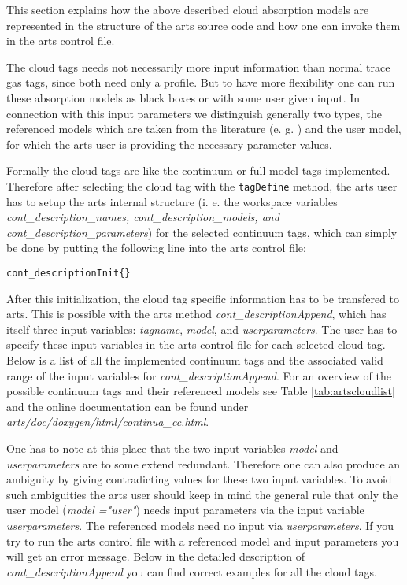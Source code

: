 {This section explains how the above described cloud absorption models
are represented in the structure of the arts source code and how 
one can invoke them in the arts control file.

The cloud tags needs not necessarily more input information than 
normal trace gas tags, since both need only a profile. But to have 
more flexibility one can run these absorption models as black boxes 
or with some user given input. In connection with this input parameters 
we distinguish generally two types, the referenced models which 
are taken from the literature (e. g. \cite{liebeetal:93}) and the 
user model, for which the arts user is providing the necessary 
parameter values.

Formally the cloud tags are like the 
continuum or full model tags implemented. Therefore after selecting 
the cloud tag with the {\tt tagDefine} method, the arts user has to 
setup the arts internal structure (i. e. the workspace variables 
{\it cont\_description\_names, cont\_description\_models, 
and cont\_description\_parameters}) for the selected continuum tags, 
which can simply be done by putting the following line into the 
arts control file:
\begin{verbatim}
cont_descriptionInit{}
\end{verbatim}

After this initialization, the cloud tag specific
information has to be transfered to arts. This is possible with the 
arts method {\it cont\_descriptionAppend}, which has itself 
three input variables: {\it tagname}, {\it model}, and 
{\it userparameters}. The user has to specify these input 
variables in the arts control file for each selected cloud tag. 
Below is a list of all the implemented continuum tags and the associated
valid range of the input variables for {\it cont\_descriptionAppend}. 
For an overview of the possible continuum tags and their 
referenced models see Table \ref{tab:artscloudlist} and the 
online documentation can be found under 
{\it arts/doc/doxygen/html/continua\_cc.html}.

One has to note at this place that the two input variables {\it model} and
{\it userparameters} are to some extend redundant. Therefore one can also 
produce an ambiguity by giving contradicting values for these two input variables.
To avoid such ambiguities the arts user should keep in mind the general 
rule that only the user model ({\it model ="user"}) needs input parameters 
via the input variable {\it userparameters}. The referenced models 
need no input via {\it userparameters}. If you try to run the arts control 
file with a referenced model and input parameters you will get an error message.
Below in the detailed description of {\it cont\_descriptionAppend} you 
can find correct examples for all the cloud tags.

}
